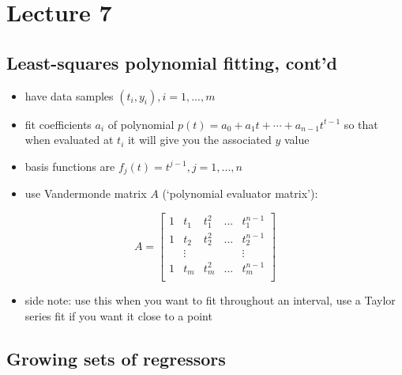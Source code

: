\documentclass[10pt,letterpaper]{article}
\begin{document}
\section{Lecture 7}
\label{sec-5}
\subsection{Least-squares polynomial fitting, cont'd}
\label{sec-5_1}

\begin{itemize}
\item have data samples $(t_i, y_i), i=1,...,m$
\item fit coefficients $a_i$ of polynomial $p(t)= a_0 + a_1 t + \cdots + a _{n-1} t ^{t-1}$ so that when evaluated at $t_i$ it will give you the associated $y$ value
\item basis functions are $f_j(t)= t ^{j-1}, j=1,...,n$
\item use Vandermonde matrix $A$ (`polynomial evaluator matrix'):
\end{itemize}
\[
A=
\begin{bmatrix}
  1 & t_1    & t_1^2 & ... & t_1^{n-1} \\
  1 & t_2    & t_2^2 & ... & t_2^{n-1} \\
    & \vdots &       &     & \vdots    \\
  1 & t_m    & t_m^2 & ... & t_m^{n-1} \\
\end{bmatrix}
\]
\begin{itemize}
\item side note: use this when you want to fit throughout an interval, use a Taylor series fit if you want it close to a point
\end{itemize}
\subsection{Growing sets of regressors}
\label{sec-5_2}
\end{document}
